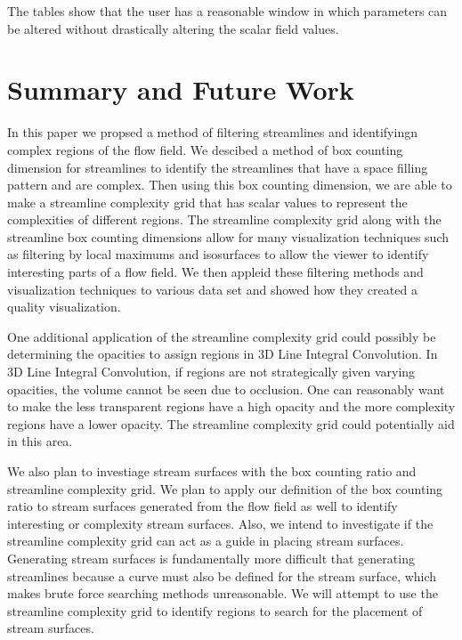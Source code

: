 \documentclass{egpubl}
\begin{document}
The tables show that the user has a reasonable window in which parameters can be altered without drastically altering the scalar field values.


\section{Summary and Future Work}

In this paper we propsed a method of filtering streamlines and identifyingn complex regions of the flow field.
We descibed a method of box counting dimension for streamlines to identify the streamlines that have a space filling pattern and are complex.
Then using this box counting dimension, we are able to make a streamline complexity grid that has scalar values to represent the complexities of different regions.
The streamline complexity grid along with the streamline box counting dimensions allow for many visualization techniques such as filtering by local maximums and isosurfaces to allow the viewer to identify interesting parts of a flow field.
We then appleid these filtering methods and visualization techniques to various data set and showed how they created a quality visualization.

One additional application of the streamline complexity grid could possibly be determining the opacities to assign regions in 3D Line Integral Convolution.
In 3D Line Integral Convolution, if regions are not strategically given varying opacities, the volume cannot be seen due to occlusion.
One can reasonably want to make the less transparent regions have a high opacity and the more complexity regions have a lower opacity.
The streamline complexity grid could potentially aid in this area.

We also plan to investiage stream surfaces with the box counting ratio and streamline complexity grid.
We plan to apply our definition of the box counting ratio to stream surfaces generated from the flow field as well to identify interesting or complexity stream surfaces.
Also, we intend to investigate if the streamline complexity grid can act as a guide in placing stream surfaces.
Generating stream surfaces is fundamentally more difficult that generating streamlines because a curve must also be defined for the stream surface, which makes brute force searching methods unreasonable.
We will attempt to use the streamline complexity grid to identify regions to search for the placement of stream surfaces.

%


\end{document}
